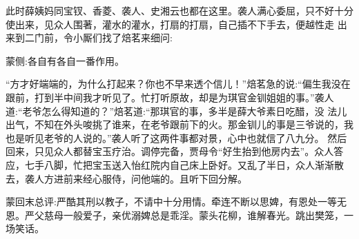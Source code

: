 \begin{parag}
    此时薛姨妈同宝钗、香菱、袭人、史湘云也都在这里。袭人满心委屈，只不好十分使出来，见众人围著，灌水的灌水，打扇的打扇，自己插不下手去，便越性走 出来到二门前，令小厮们找了焙茗来细问:\begin{note}蒙侧:各自有各自一番作用。\end{note}“方才好端端的，为什么打起来？你也不早来透个信儿！”焙茗急的说:“偏生我没在跟前，打到半中间我才听见了。忙打听原故，却是为琪官金钏姐姐的事。”袭人道:“老爷怎么得知道的？”焙茗道:“那琪官的事，多半是薛大爷素日吃醋，没 法儿出气，不知在外头唆挑了谁来，在老爷跟前下的火。那金钏儿的事是三爷说的，我也是听见老爷的人说的。”袭人听了这两件事都对景，心中也就信了八九分。 然后回来，只见众人都替宝玉疗治。调停完备，贾母令“好生抬到他房内去”。众人答应，七手八脚，忙把宝玉送入怡红院内自己床上卧好。又乱了半日，众人渐渐散去，袭人方进前来经心服侍，问他端的。且听下回分解。
\end{parag}


\begin{parag}
    \begin{note}蒙回末总评:严酷其刑以教子，不请中十分用情。牵连不断以思婢，有恩处一等无恩。严父慈母一般爱子，亲优溺婢总是乖淫。蒙头花柳，谁解春光。跳出樊笼，一场笑话。\end{note}
\end{parag}

